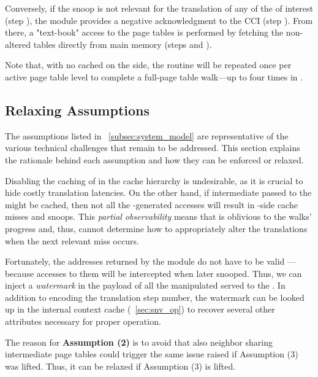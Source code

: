         Conversely, if the snoop is not relevant for the translation of any of the  of interest (step ), the \sname module provides a negative acknowledgment to the CCI (step ).
        From there, a "text-book" access to the page tables is performed by fetching the non-altered tables directly from main memory (steps  and ).

        Note that, with no  cached on the \pe side, the routine will be repeated once per active page table level to complete a full-page table walk---\eg up to four times in .

    \subsection{Relaxing \sname Assumptions} 
        \label{subsec:challenges}

        The assumptions listed in \sect~\ref{subsec:system_model} are representative of the various technical challenges that remain to be addressed.
        This section explains the rationale behind each assumption and how they can be enforced or relaxed.

            Disabling the caching of  in the cache hierarchy is undesirable, as it is crucial to hide costly translation latencies.
            On the other hand, if intermediate  passed to the \pe might be cached, then not all the \mmu-generated \pte accesses will result in \pe-side cache misses and snoops.             This \emph{partial observability} means that \sname is oblivious to the walks' progress and, thus, cannot determine how to appropriately alter the translations when the next relevant \pte miss occurs. 
            
            Fortunately, the \pte addresses returned by the \sname module do not have to be valid ---because accesses to them will be intercepted when later snooped. Thus, we can inject a \emph{watermark} in the payload of all the manipulated  served to the \pe.
            In addition to encoding the translation step number, the watermark can be looked up in the internal context cache (\sect~\ref{sec:snv_op}) to recover several other attributes necessary for proper \sname operation.
            

            The reason for \textbf{Assumption (2)} is to avoid that also neighbor  sharing intermediate page tables could trigger the same issue raised if Assumption (3) was lifted. Thus, it can be relaxed if Assumption (3) is lifted. 

